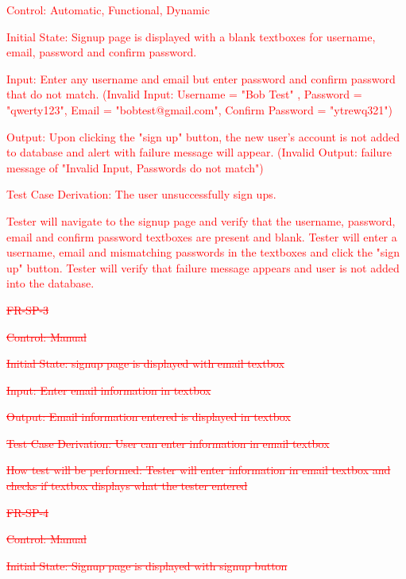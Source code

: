 \documentclass[12pt, titlepage]{article}
\begin{document}
\begin{enumerate}
	\textcolor{red}{Control: Automatic, Functional, Dynamic}
	
	\textcolor{red}{Initial State: Signup page is displayed with a blank textboxes for username, email, password and confirm password.}
	
	\textcolor{red}{Input: Enter any username and email but enter password and confirm password that do not match. (Invalid Input: Username = "Bob Test" , Password = "qwerty123", Email = "bobtest@gmail.com", Confirm Password = "ytrewq321")}
	
	\textcolor{red}{Output: Upon clicking the "sign up" button, the new user's account is not added to database and alert with failure message will appear. (Invalid Output: failure message of "Invalid Input, Passwords do not match")}
	
	\textcolor{red}{Test Case Derivation: The user unsuccessfully sign ups.}
	
	\textcolor{red}{\textcolor{red}{Tester will navigate to the signup page and verify that the username, password, email and confirm password textboxes are present and blank. Tester will enter a username, email and mismatching passwords in the textboxes and click the "sign up" button. Tester will verify that failure message appears and user is not added into the database.}}
	
\item{\textcolor{red}{\sout{FR-SP-3}}
	
\textcolor{red}{\sout{Control: Manual}}

\textcolor{red}{\sout{Initial State: signup page is displayed with email textbox}}

\textcolor{red}{\sout{Input: Enter email information in textbox}}

\textcolor{red}{\sout{Output: Email information entered is displayed in textbox}}

\textcolor{red}{\sout{Test Case Derivation: User can enter information in email textbox}}

\textcolor{red}{\sout{How test will be performed: Tester will enter information in email textbox and checks if textbox displays what the tester entered}}

\item{\textcolor{red}{\sout{FR-SP-4}}\\}

\textcolor{red}{\sout{Control: Manual}}

\textcolor{red}{\sout{Initial State: Signup page is displayed with signup button}}

}
\end{enumerate}
\end{document}
